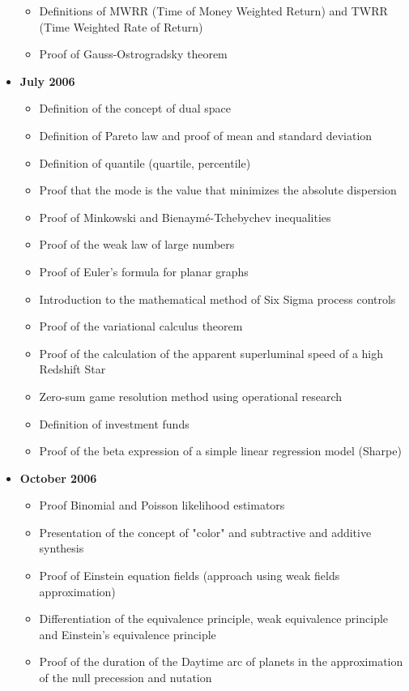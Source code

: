\documentclass[12pt,a4paper,twoside,openright]{report}
\theoremstyle{definition}
\theoremstyle{itexmp}
\numberwithin{equation}{section}
\begin{document}
\begin{itemize}
\begin{itemize}[noitemsep]
				\item Definitions of MWRR (Time of Money Weighted Return) and TWRR (Time Weighted Rate of Return)
				\item Proof of Gauss-Ostrogradsky theorem 
			\end{itemize}
		\item \textbf{July 2006}
			\begin{itemize}[noitemsep]
				\item Definition of the concept of dual space
				\item Definition of Pareto law and proof of mean and standard deviation
				\item Definition of quantile (quartile, percentile)
				\item Proof that the mode is the value that minimizes the absolute dispersion
				\item Proof of Minkowski and Bienaymé-Tchebychev inequalities
				\item Proof of the weak law of large numbers 
				\item Proof of Euler's formula for planar graphs
				\item Introduction to the mathematical method of Six Sigma process controls
				\item Proof of the variational calculus theorem
				\item Proof of the calculation of the apparent superluminal speed of a high Redshift Star
				\item Zero-sum game resolution method using operational research
				\item Definition of investment funds
				\item Proof of the beta expression of a simple linear regression model (Sharpe)				
			\end{itemize}
		\item \textbf{October 2006}
			\begin{itemize}[noitemsep]
				\item Proof Binomial and Poisson likelihood estimators
				\item Presentation of the concept of "color" and subtractive and additive synthesis
				\item Proof of Einstein equation fields (approach using weak fields approximation)
				\item Differentiation of the equivalence principle, weak equivalence principle and Einstein's equivalence principle
				\item Proof of the duration of the Daytime arc of planets in the approximation of the null precession and nutation

\end{itemize}
\end{itemize}
\end{document}
